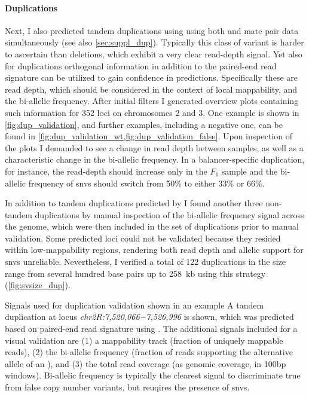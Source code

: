 \paragraph{Duplications} Next, I also predicted tandem duplications using \delly
using both \wgs and mate pair data simultaneously (see also
\cref{sec:suppl_dup}). Typically this class of variant is harder to
ascertain than deletions, which exhibit a very clear read-depth signal.
Yet also for duplications orthogonal information in addition
to the paired-end read signature can be utilized to gain confidence in
predictions. Specifically these are read depth, which should be considered in
the context of local mappability, and the bi-allelic frequency.                 
After initial filters I generated overview plots containing such information for
352 loci on chromosomes 2 and 3. One example is shown in
\cref{fig:dup_validation}, and further examples, including a negative one, can
be found in \cref{fig:dup_validation_wt,fig:dup_validation_false}.
Upon inspection of the plots I demanded to see a change in read depth between
samples, as well as a characteristic change in the bi-allelic frequency. In a
balancer-specific duplication, for instance, the read-depth should increase only
in the $F_1$ sample and the bi-allelic frequency of \acp{snv} should switch from
50\% to either 33\% or 66\%.

In addition to tandem duplications predicted by \delly I found another three
non-tandem duplications by manual inspection of the bi-allelic frequency signal
across the genome, which were then included in the set of duplications prior
to manual validation. Some predicted loci could not be validated because they
resided within low-mappability regions, rendering both read depth and allelic
support for \acp{snv} unreliable. Nevertheless, I verified a total of 122
duplications in the size range from several hundred base pairs up to 258~kb
using this strategy (\cref{fig:svsize_dup}).

    {Signals used for duplication validation shown in an example}
    {A tandem duplication at locus \textit{chr2R:7,520,066−7,526,996} is shown,
    which was predicted based on paired-end read signature using \delly.
    The additional signals
    included for a visual validation are (1) a mappability track (fraction
    of uniquely mappable reads), (2) the bi-allelic frequency (fraction of
    reads supporting the alternative allele of an \snv), and (3)
    the total read coverage (as genomic coverage, in 100bp windows). Bi-allelic
    frequency is typically the clearest signal to discriminate true from false
    copy number variants, but reuqires the presence of \acp{snv}.}

